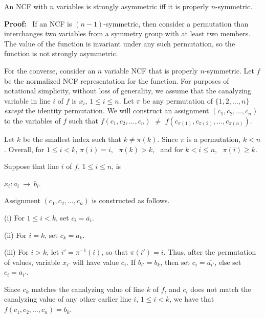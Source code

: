 \begin{theorem}\label{thm:ncf_strong_asymmetry}
An NCF with $n$ variables is strongly asymmetric iff
it is properly $n$-symmetric.
\end{theorem}

\noindent
\textbf{Proof:}~ 
If an NCF is $(n-1)$-symmetric, then consider a permutation than
interchanges two variables from a symmetry group with at least two
members.  The value of the function is invariant under any such
permutation, so the function is not strongly asymmetric.

For the converse, consider an $n$ variable NCF that is properly $n$-symmetric.
Let $f$ be the normalized NCF representation for the function.  For
purposes of notational simplicity, without loss of generality,
we assume that the canalyzing
variable in line $i$ of $f$ is $x_i$, $1 \leq i \leq n$.  Let $\pi$
be any permutation of $\{1, 2, \ldots, n\}$ \emph{except} the
identity permutation.  We will construct an assignment $(c_1, c_2,
\ldots,  c_n)$ to the variables of $f$ such that $f(c_1, c_2, \ldots,
c_n)$ $\neq$ $f(c_{\pi(1)}, c_{\pi(2)}, \ldots, c_{\pi(n)})$.

Let $k$ be the smallest index such that $k \neq \pi(k)$.  Since
$\pi$ is a permutation, $k < n$.  Overall, for $1 \leq i < k$,
$\pi(i) = i$,~ $\pi(k) > k$,~ and for $k < i \leq n$,~ $\pi(i) \geq k$.

Suppose that line $i$ of $f$, $1 \leq i \leq n$, is 

\smallskip

\hspace*{1in} $x_i : a_i ~\longrightarrow~ b_i$. 

\smallskip

\noindent
Assignment $(c_1, c_2, \ldots,  c_n)$ is constructed as follows.
\begin{description}
\item{(i)} For $1 \leq i < k$, set $c_i = \overline{a_i}$.  
\item{(ii)} For $i = k$, set $c_k =a_k$. 
\item{(iii)} For $i > k$, let $i' = \pi^{-1}(i)$, so that $\pi(i')
= i$.  Thus, after the permutation of values, variable $x_{i'}$
will have value $c_i$.  If $b_{i'} = b_k$, then set $c_i =
\overline{a_{i'}}$, else set $c_i =  a_{i'}$.
\end{description}
Since $c_k$ matches the canalyzing value of line $k$ of $f$, and
$c_i$ does not match the canalyzing value of any other earlier line
$i$, $1 \leq i < k$, we have that $f(c_1, c_2, \ldots,  c_n) = b_k$.

